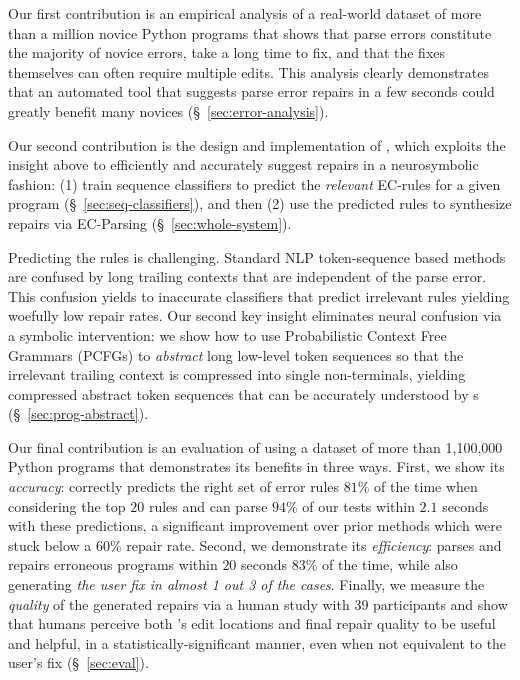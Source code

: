 %
Our first contribution is an empirical analysis of a real-world
dataset of more than a million novice Python programs that shows
that parse errors constitute the majority of novice errors, take a long
time to fix, and that the fixes themselves can often require
multiple edits.
%
This analysis clearly demonstrates that an automated tool that
suggests parse error repairs in a few seconds could greatly
benefit many novices (\S~\ref{sec:error-analysis}).

%
Our second contribution is the design and implementation
of \toolname, which exploits the insight above to
efficiently and accurately suggest repairs in a
neurosymbolic fashion:
%
(1) train sequence classifiers to predict the \emph{relevant}
EC-rules for a given program (\S~\ref{sec:seq-classifiers}), and then
%
(2) use the predicted rules to synthesize repairs
via EC-Parsing (\S~\ref{sec:whole-system}).

%
Predicting the rules is challenging.
Standard NLP token-sequence based
methods are confused by long
trailing contexts that are
independent of the parse error.
%
This confusion yields to inaccurate
classifiers that predict irrelevant
rules yielding woefully low repair rates.
%
Our second key insight eliminates neural confusion
via a symbolic intervention: we show how to use
Probabilistic Context Free Grammars (PCFGs)
to \emph{abstract} long low-level token
sequences so that the irrelevant trailing
context is compressed into single non-terminals,
yielding compressed abstract token sequences
that can be accurately understood by \dnn{}s
(\S~\ref{sec:prog-abstract}).

%
Our final contribution is an evaluation of \toolname
using a dataset of more than 1,100,000 Python programs
that demonstrates its benefits in three ways.
%
First, we show its \emph{accuracy}: \toolname correctly predicts
the right set of error rules $81\%$ of the time when considering the top $20$
rules and can parse $94\%$ of our tests within $2.1$ seconds with these
predictions, a significant improvement over prior methods
which were stuck below a $60\%$ repair rate.
%
Second, we demonstrate its \emph{efficiency}: \toolname parses and repairs
erroneous programs within $20$ seconds $83\%$ of the time, while also generating
\emph{the user fix in almost 1 out 3 of the cases}.
%
Finally, we measure the \emph{quality} of the generated repairs via a human
study with 39 participants and show that humans perceive both \toolname's edit
locations and final repair quality to be useful and helpful, in a
statistically-significant manner, even when not equivalent to the user's fix
(\S~\ref{sec:eval}).

